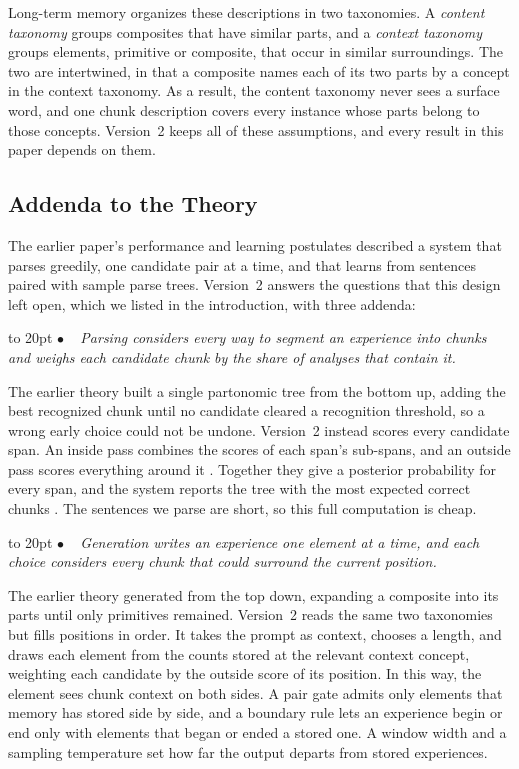 \documentclass[11pt,letterpaper]{article}
\def\texitem#1{\par\noindent\hangindent 20pt\hbox to 20pt {\hss #1 ~}\ignorespaces}
\def\bull{\texitem{$\bullet$}}
\begin{document}
Long-term memory organizes these descriptions in two taxonomies. A {\it content
taxonomy\/} groups composites that have similar parts, and a {\it context taxonomy\/}
groups elements, primitive or composite, that occur in similar surroundings. The two
are intertwined, in that a composite names each of its two parts by a concept in the
context taxonomy. As a result, the content taxonomy never sees a surface word, and one
chunk description covers every instance whose parts belong to those concepts. Version~2
keeps all of these assumptions, and every result in this paper depends on them.

\subsection{Addenda to the Theory}

The earlier paper's performance and learning postulates described a system that parses
greedily, one candidate pair at a time, and that learns from sentences paired with
sample parse trees. Version~2 answers the questions that this design left open, which
we listed in the introduction, with three addenda:

\vskip 0.05in

\bull
{\it Parsing considers every way to segment an experience into chunks and weighs each
candidate chunk by the share of analyses that contain it.\/}

\vskip 0.02in
\noindent
The earlier theory built a single partonomic tree from the bottom up, adding the best
recognized chunk until no candidate cleared a recognition threshold, so a wrong early
choice could not be undone. Version~2 instead scores every candidate span. An inside
pass combines the scores of each span's sub-spans, and an outside pass scores everything
around it \citep{lari-young}. Together they give a posterior probability for every span,
and the system reports the tree with the most expected correct chunks
\citep{goodman-metrics}. The sentences we parse are short, so this full computation is
cheap.

\vskip 0.05in

\bull
{\it Generation writes an experience one element at a time, and each choice considers
every chunk that could surround the current position.\/}

\vskip 0.02in
\noindent
The earlier theory generated from the top down, expanding a composite into its parts
until only primitives remained. Version~2 reads the same two taxonomies but fills
positions in order. It takes the prompt as context, chooses a length, and draws each
element from the counts stored at the relevant context concept, weighting each candidate
by the outside score of its position. In this way, the element sees chunk context on
both sides. A pair gate admits only elements that memory has stored side by side, and
a boundary rule lets an experience begin or end only with elements that began or ended a
stored one. A window width and a sampling temperature set how far the output departs
from stored experiences.
\end{document}
